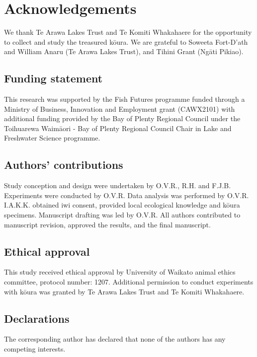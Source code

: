 \documentclass[
  12pt,
  a4paper,
  oneside]{scrbook}
\newcounter{none} %
\begin{document}
\section{Acknowledgements}\label{acknowledgements-3}

We thank Te Arawa Lakes Trust and Te Komiti Whakahaere for the
opportunity to collect and study the treasured kōura. We are grateful to
Soweeta Fort-D'ath and William Anaru (Te Arawa Lakes Trust), and Tihini
Grant (Ngāti Pikiao).

\subsection{Funding statement}\label{funding-statement-2}

This research was supported by the Fish Futures programme funded through
a Ministry of Business, Innovation and Employment grant (CAWX2101) with
additional funding provided by the Bay of Plenty Regional Council under
the Toihuarewa Waimāori - Bay of Plenty Regional Council Chair in Lake
and Freshwater Science programme.

\subsection{Authors' contributions}\label{authors-contributions-2}

Study conception and design were undertaken by O.V.R., R.H. and F.J.B.
Experiments were conducted by O.V.R. Data analysis was performed by
O.V.R. I.A.K.K. obtained iwi consent, provided local ecological
knowledge and kōura specimens. Manuscript drafting was led by O.V.R. All
authors contributed to manuscript revision, approved the results, and
the final manuscript.

\subsection{Ethical approval}\label{ethical-approval-2}

This study received ethical approval by University of Waikato animal
ethics committee, protocol number: 1207. Additional permission to
conduct experiments with kōura was granted by Te Arawa Lakes Trust and
Te Komiti Whakahaere.

\subsection{Declarations}\label{declarations-2}

The corresponding author has declared that none of the authors has any
competing interests.
\end{document}
